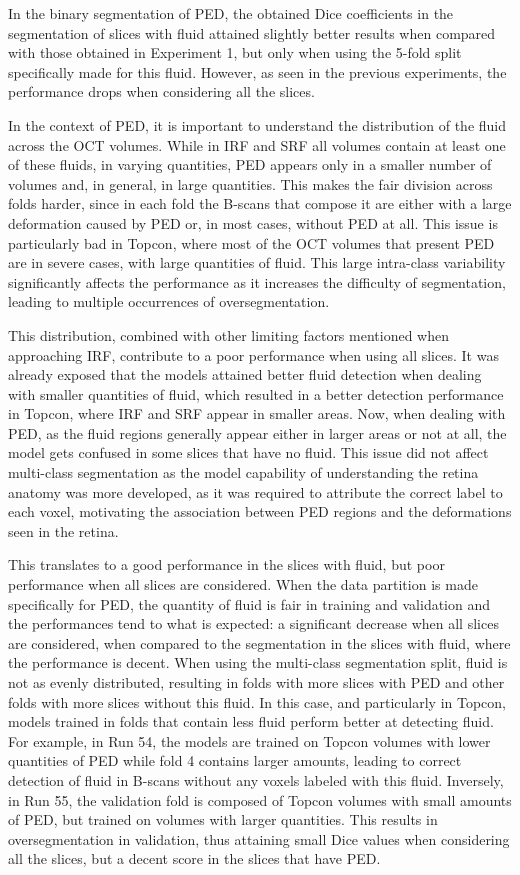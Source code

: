 In the binary segmentation of PED, the obtained Dice coefficients in the segmentation of slices with fluid attained slightly better results when compared with those obtained in Experiment 1, but only when using the 5-fold split specifically made for this fluid. However, as seen in the previous experiments, the performance drops when considering all the slices.
\par
In the context of PED, it is important to understand the distribution of the fluid across the OCT volumes. While in IRF and SRF all volumes contain at least one of these fluids, in varying quantities, PED appears only in a smaller number of volumes and, in general, in large quantities. This makes the fair division across folds harder, since in each fold the B-scans that compose it are either with a large deformation caused by PED or, in most cases, without PED at all. This issue is particularly bad in Topcon, where most of the OCT volumes that present PED are in severe cases, with large quantities of fluid. This large intra-class variability significantly affects the performance as it increases the difficulty of segmentation, leading to multiple occurrences of oversegmentation.
\par
This distribution, combined with other limiting factors mentioned when approaching IRF, contribute to a poor performance when using all slices. It was already exposed that the models attained better fluid detection when dealing with smaller quantities of fluid, which resulted in a better detection performance in Topcon, where IRF and SRF appear in smaller areas. Now, when dealing with PED, as the fluid regions generally appear either in larger areas or not at all, the model gets confused in some slices that have no fluid. This issue did not affect multi-class segmentation as the model capability of understanding the retina anatomy was more developed, as it was required to attribute the correct label to each voxel, motivating the association between PED regions and the deformations seen in the retina.
\par
This translates to a good performance in the slices with fluid, but poor performance when all slices are considered. When the data partition is made specifically for PED, the quantity of fluid is fair in training and validation and the performances tend to what is expected: a significant decrease when all slices are considered, when compared to the segmentation in the slices with fluid, where the performance is decent. When using the multi-class segmentation split, fluid is not as evenly distributed, resulting in folds with more slices with PED and other folds with more slices without this fluid. In this case, and particularly in Topcon, models trained in folds that contain less fluid perform better at detecting fluid. For example, in Run 54, the models are trained on Topcon volumes with lower quantities of PED while fold 4 contains larger amounts, leading to correct detection of fluid in B-scans without any voxels labeled with this fluid. Inversely, in Run 55, the validation fold is composed of Topcon volumes with small amounts of PED, but trained on volumes with larger quantities. This results in oversegmentation in validation, thus attaining small Dice values when considering all the slices, but a decent score in the slices that have PED.
